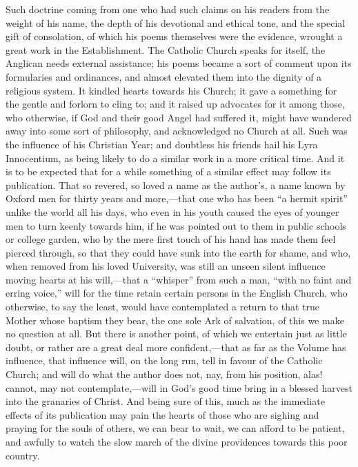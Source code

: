 Such doctrine coming from one who had such claims
on his readers from the weight of his name, the depth of his
devotional and ethical tone, and the special gift of consolation, of
which his poems themselves were the evidence, wrought a great work in
the Establishment. The Catholic Church speaks for itself, the Anglican
needs external assistance; his poems became a sort of comment upon its
formularies and ordinances, and almost elevated them into the dignity
of a religious system. It kindled hearts towards his Church; it gave a
something for the gentle and forlorn to cling to; and it raised up
advocates for it among those, who otherwise, if God and their good
Angel had suffered it, might have wandered away into some sort of
philosophy, and acknowledged no Church at all. Such was the influence
of his Christian Year; and doubtless his friends hail his Lyra
Innocentium, as being likely to do a similar work in a more critical
time. And it is to be expected that for a while something of a similar
effect may follow its publication. That so revered, so loved a name as
the author's, a name known by Oxford men for thirty years and
more,—that one who has been ``a hermit spirit'' unlike the world all
his days, who even in his youth caused the eyes of younger men
to turn keenly towards him, if he was pointed out to them in public
schools or college garden, who by the mere first touch of his hand has
made them feel pierced through, so that they could have sunk into the
earth for shame, and who, when removed from his loved University, was
still an unseen silent influence moving hearts at his will,—that a ``whisper''
from such a man, ``with no faint and erring voice,'' will for the time
retain certain persons in the English Church, who otherwise, to say
the least, would have contemplated a return to that true Mother whose
baptism they bear, the one sole Ark of salvation, of this we make no
question at all. But there is another point, of which we entertain
just as little doubt, or rather are a great deal more
confident,—that as far as the Volume has influence, that influence
will, on the long run, tell in favour of the Catholic Church; and will
do what the author does not, nay, from his position, alas! cannot, may
not contemplate,—will in God's good time bring in a blessed harvest
into the granaries of Christ. And being sure of this, much as the
immediate effects of its publication may pain the hearts of those who
are sighing and praying for the souls of others, we can bear to wait,
we can afford to be patient, and awfully to watch the slow march of
the divine providences towards this poor country.

